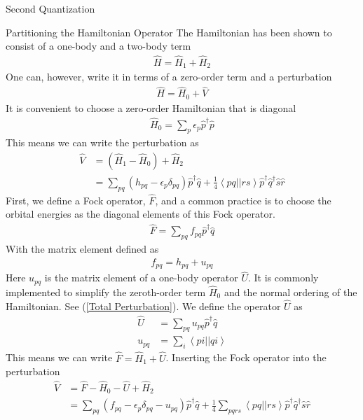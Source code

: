 \documentclass[twoside,english]{uiofysmaster}
\begin{document}
\begin{chapter}{Second Quantization}
	\begin{section}{Partitioning the Hamiltonian Operator}
		The Hamiltonian has been shown to consist of a one-body and a two-body term
		\begin{align}
			\hat H = \hat H_1 + \hat H_2
		\end{align}
		One can, however, write it in terms of a zero-order term and a perturbation
		\begin{align}
			\hat H = \hat H_0 + \hat V
		\end{align}
		It is convenient to choose a zero-order Hamiltonian that is diagonal
		\begin{align}
			\hat H_0 = \sum_p \epsilon_p \hat p^\dagger \hat p
		\end{align}
		This means we can write the perturbation as
		\begin{align}
			\hat V &= (\hat H_1 - \hat H_0) + \hat H_2 \\
			&= \sum_{pq}(h_{pq} - \epsilon_p \delta_{pq} ) \hat p^\dagger \hat q + \frac{1}{4}\left<pq||rs\right>\hat p^\dagger \hat q^\dagger \hat s \hat r 
		\end{align}
		First, we define a Fock operator, $\hat F$, and a common practice is to choose the orbital energies as the diagonal elements of this Fock operator. 
		\begin{align}
			\hat F = \sum_{pq} f_{pq} \hat p^\dagger \hat q
		\end{align}
		With the matrix element defined as
		\begin{align}
			f_{pq} = h_{pq} + u_{pq}
		\end{align}
		Here $u_{pq}$ is the matrix element of a one-body operator $\hat U$. It is commonly implemented to simplify the zeroth-order term $\hat H_0$ and the normal ordering of the Hamiltonian. See (\ref{Total Perturbation}). We define the operator $\hat U$ as
		\begin{align}
			\hat U &= \sum_{pq} u_{pq} \hat p^\dagger \hat q \\
			u_{pq} &= \sum_i \left<pi||qi\right>
		\end{align}
		This means we can write $\hat F = \hat H_1 + \hat U$. Inserting the Fock operator into the perturbation
		\begin{align}
			\hat V &= \hat F - \hat H_0 - \hat U + \hat H_2 \\
				   &= \sum_{pq}(f_{pq} - \epsilon_p \delta_{pq} - u_{pq}) \hat p^\dagger \hat q + \frac{1}{4} \sum_{pqrs} \left<pq||rs\right> \hat p^\dagger \hat q^\dagger \hat s \hat r
			\label{3.93}	
		\end{align}

\end{section}
\end{chapter}
\end{document}
